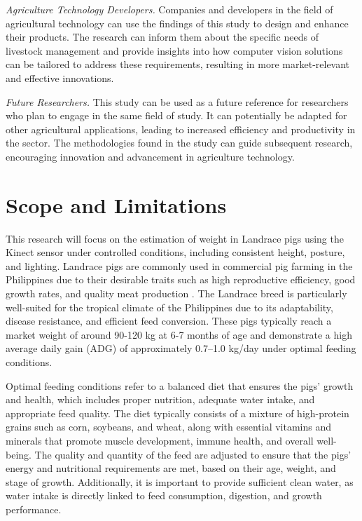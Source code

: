 {\textit{Agriculture Technology Developers.} Companies and developers in the field of agricultural technology can use the findings of this study to design and enhance their products. The research can inform them about the specific needs of livestock management and provide insights into how computer vision solutions can be tailored to address these requirements, resulting in more market-relevant and effective innovations.

\textit{Future Researchers.} This study can be used as a future reference for researchers who plan to engage in the same field of study. It can potentially be adapted for other agricultural applications, leading to increased efficiency and productivity in the sector. The methodologies found in the study can guide subsequent research, encouraging innovation and advancement in agriculture technology.

\section{Scope and Limitations}

This research will focus on the estimation of weight in Landrace pigs using the Kinect sensor under controlled conditions, including consistent height, posture, and lighting. Landrace pigs are commonly used in commercial pig farming in the Philippines due to their desirable traits such as high reproductive efficiency, good growth rates, and quality meat production \citep{Manez2020}. The Landrace breed is particularly well-suited for the tropical climate of the Philippines due to its adaptability, disease resistance, and efficient feed conversion. These pigs typically reach a market weight of around 90-120 kg at 6-7 months of age and demonstrate a high average daily gain (ADG) of approximately 0.7–1.0 kg/day under optimal feeding conditions.

Optimal feeding conditions refer to a balanced diet that ensures the pigs’ growth and health, which includes proper nutrition, adequate water intake, and appropriate feed quality. The diet typically consists of a mixture of high-protein grains such as corn, soybeans, and wheat, along with essential vitamins and minerals that promote muscle development, immune health, and overall well-being. The quality and quantity of the feed are adjusted to ensure that the pigs' energy and nutritional requirements are met, based on their age, weight, and stage of growth. Additionally, it is important to provide sufficient clean water, as water intake is directly linked to feed consumption, digestion, and growth performance.

}
